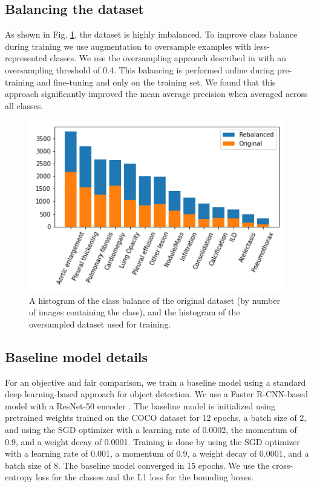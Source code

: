 \documentclass[conference]{IEEEtran}
\begin{document}
\subsection{Balancing the dataset}

As shown in Fig. \ref{fig:class-balance}, the dataset is highly imbalanced. To improve class balance during training we use augmentation to oversample examples with less-
represented classes. We use the oversampling approach described in \cite{gupta2019lvis} with an oversampling threshold of 0.4. This balancing is performed 
online during pre-training and fine-tuning and only on the training set. We found that this approach significantly improved the mean average precision when 
averaged across all classes.

\begin{figure}[t]
\centering
\includegraphics[width=\columnwidth]{images/rebalace}
\caption{A histogram of the class balance of the original dataset (by number of images containing the class), and the histogram of the oversampled dataset used for training.}
\label{fig:class-balance}
\end{figure}

\subsection{Baseline model details}

For an objective and fair comparison, we train a baseline model using a standard 
deep learning-based approach for object detection. We use a Faster R-CNN-based 
model \cite{DBLP:conf/nips/RenHGS15} with a ResNet-50 encoder \cite{He_2016_CVPR}. 
The baseline model is initialized using pretrained weights trained on the COCO dataset for 
12 epochs, a batch size of 2, and using the SGD optimizer with a learning rate of 
0.0002, the momentum of 0.9, and a weight decay of 0.0001. Training
is done by using the SGD optimizer with a learning rate of 0.001, a momentum of 0.9, a weight decay 
of 0.0001, and a batch size of 8. The baseline model converged in 15 epochs. We use the cross-entropy loss
for the classes and the L1 loss for the bounding boxes.
\end{document}

